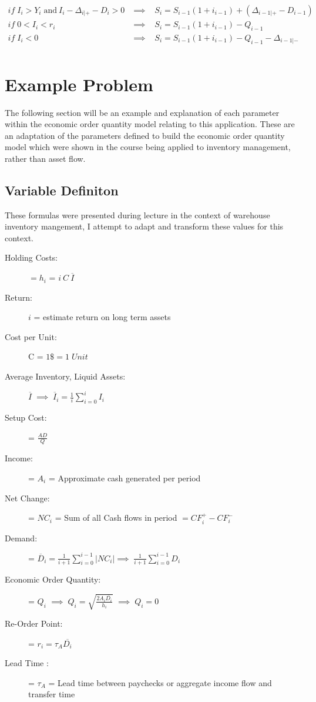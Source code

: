 \documentclass{article}
\begin{document}
\begin{align*}
	if \; I_{i} > Y_{i} \; \text{and} \: I_{i} - \Delta_{i|+} - D_{i} > 0 	& \implies \;\;\; S_{i} = S_{i-1}(1+i_{i-1}) + ( \Delta_{i-1|+} - D_{i-1})\\
	if \; 0 < I_{i} < r_{i} 							& \implies \;\;\; S_{i} = S_{i-1}(1+i_{i-1}) - Q_{i-1}\\
	if \; I_{i} < 0  								& \implies \;\;\; S_{i} = S_{i-1}(1+i_{i-1}) - Q_{i-1} -  \Delta_{i-1|-}\\
\end{align*}

\section{Example Problem}
The following section will be an example and explanation of each parameter within the economic order quantity model relating to this application. These are an adaptation of the parameters defined to build the economic order quantity model which were shown in the course \cite{Askin2019} being applied to inventory management, rather than asset flow.

\subsection{Variable Definiton}  

These formulas were presented during lecture \cite{Askin2019} in the context of warehouse inventory mangement, I attempt to adapt and transform these values for this context. 

\begin{description}
	\item[Holding Costs:] $= h_{i}$ = \; $ i \:C\: \overline{I} $
	\item[Return:] $ i $ = estimate return on long term assets
	\item[Cost per Unit:] C = $1\$ =1 \; Unit $
	\item[Average Inventory, Liquid Assets:] $\overline{I} \; \implies \; \overline{I}_{i} = \frac{1}{i}\sum_{i=0}^{i}I_{i}$
	\item[Setup Cost:]  = $\frac{AD}{Q}$
	\item[Income:]  = $A_{i}$ = Approximate cash generated per period
	\item[Net Change:]= $NC_{i}$ = \; Sum of all Cash flows in period \; $=CF_{i}^{+}-CF_{i}^{-}$
	\item[Demand:]= $\overline{D}_{i} = \frac{1}{i + 1}\sum_{i=0}^{i-1}|NC_{i}| \implies \; \frac{1}{i + 1}\sum_{i=0}^{i-1}D_{i}$
	\item[Economic Order Quantity:]= $Q_{i}$
	\subitem[if $I_{i} < r_{i}$] $\implies\;  Q_{i} = \sqrt{\frac{2A_{i}\overline{D_{i}}}{h_{i}}}$
	\subitem[if $I_{i} > r_{i}$]$ \implies\;  Q_{i} = 0$
	\item[Re-Order Point:]= $r_{i} = \tau_{A} \overline{D_{i}}$
	\item[Lead Time :]= $\tau_{A}$ = Lead time between paychecks or aggregate income flow and transfer time
\end{description}
\end{document}
